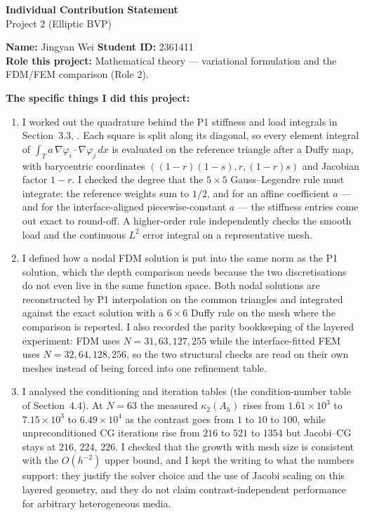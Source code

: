 \documentclass[10pt]{article}
\begin{document}
\begin{center}
    {\Large\bfseries Individual Contribution Statement}\\[0.2em]
    {\large Project 2 (Elliptic BVP)}
\end{center}

\begin{formbox}
\textbf{Name:} Jingyan Wei \hfill \textbf{Student ID:} 2361411\\
\textbf{Role this project:} Mathematical theory --- variational formulation
and the FDM/FEM comparison (Role 2).

\textbf{The specific things I did this project:}
\begin{enumerate}[leftmargin=2em,itemsep=0.25em,topsep=0.15em]
    \item I worked out the quadrature behind the P1 stiffness and load
    integrals in Section~3.3, .
    Each square is split along its diagonal, so every element integral of
    $\int_T a\,\nabla\varphi_i\cdot\nabla\varphi_j\,dx$ is evaluated on the
    reference triangle after a Duffy map, with barycentric coordinates
    $((1-r)(1-s),r,(1-r)s)$ and Jacobian factor $1-r$. I checked the degree
    that the $5\times5$ Gauss--Legendre rule must integrate: the reference
    weights sum to $1/2$, and for an affine coefficient $a$ --- and for the
    interface-aligned piecewise-constant $a$ --- the stiffness entries come
    out exact to round-off. A higher-order rule independently checks the
    smooth load and the continuous $L^2$ error integral on a representative
    mesh.

    \item I defined how a nodal FDM solution is put into the same norm as the
    P1 solution, which the depth comparison needs because the two
    discretisations do not even live in the same function space. Both nodal
    solutions are reconstructed by P1 interpolation on the common triangles
    and integrated against the exact solution with a $6\times6$ Duffy rule
    on the mesh where the comparison is reported. I also recorded the parity
    bookkeeping of the layered experiment: FDM uses $N=31,63,127,255$ while
    the interface-fitted FEM uses $N=32,64,128,256$, so the two structural
    checks are read on their own meshes instead of being forced into one
    refinement table.

    \item I analysed the conditioning and iteration tables
    (the condition-number table of Section~4.4). At $N=63$ the
    measured $\kappa_2(A_h)$ rises from $1.61\times10^3$ to
    $7.15\times10^3$ to $6.49\times10^4$ as the contrast goes from $1$ to
    $10$ to $100$, while unpreconditioned CG iterations rise from $216$ to
    $521$ to $1354$ but Jacobi--CG stays at $216$, $224$, $226$. I checked
    that the growth with mesh size is consistent with the $O(h^{-2})$ upper
    bound, and I kept the writing to what the numbers support: they justify
    the solver choice and the use of Jacobi scaling on this layered geometry,
    and they do not claim contrast-independent performance for arbitrary
    heterogeneous media.
\end{enumerate}


\end{formbox}
\end{document}
